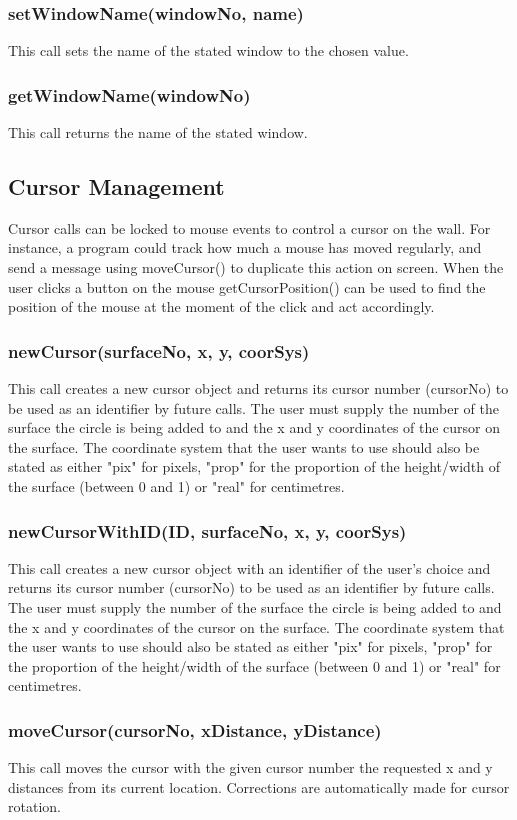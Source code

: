 \documentclass{acm_proc_article-sp}
\begin{document}
\subsubsection{setWindowName(windowNo, name)}
This call sets the name of the stated window to the chosen value.
\subsubsection{getWindowName(windowNo)}
This call returns the name of the stated window.
\subsection{Cursor Management}
Cursor calls can be locked to mouse events to control a cursor on the wall. For instance, a program could track how much a mouse has moved regularly, and send a message using moveCursor() to duplicate this action on screen. When the user clicks a button on the mouse getCursorPosition() can be used to find the position of the mouse at the moment of the click and act accordingly.
\subsubsection{newCursor(surfaceNo, x, y, coorSys)}
This call creates a new cursor object and returns its cursor number (cursorNo) to be used as an identifier by future calls. The user must supply the number of the surface the circle is being added to and the x and y coordinates of the cursor on the surface. The coordinate system that the user wants to use should also be stated as either "pix" for pixels, "prop" for the proportion of the height/width of the surface (between 0 and 1) or "real" for centimetres.
\subsubsection{newCursorWithID(ID, surfaceNo, x, y, coorSys)}
This call creates a new cursor object with an identifier of the user's choice and returns its cursor number (cursorNo) to be used as an identifier by future calls. The user must supply the number of the surface the circle is being added to and the x and y coordinates of the cursor on the surface. The coordinate system that the user wants to use should also be stated as either "pix" for pixels, "prop" for the proportion of the height/width of the surface (between 0 and 1) or "real" for centimetres.
\subsubsection{moveCursor(cursorNo, xDistance, yDistance)}
This call moves the cursor with the given cursor number the requested x and y distances from its current location. Corrections are automatically made for cursor rotation.
\end{document}
